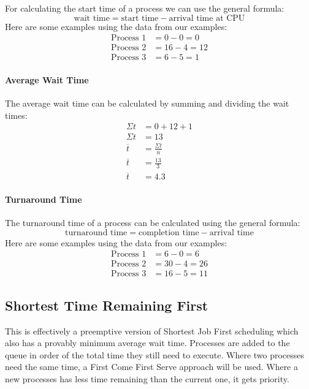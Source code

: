 For calculating the start time of a process we can use the general formula:
\[
	\text{wait time} = \text{start time} - \text{arrival time at CPU}
\]
Here are some examples using the data from our examples:
\begin{align*}
	\text{Process \(1\)} & = 0 - 0 = 0   \\
	\text{Process \(2\)} & = 16 - 4 = 12 \\
	\text{Process \(3\)} & = 6 - 5 = 1
\end{align*}

\paragraph{Average Wait Time}\label{par:average_wait_time_1}

The average wait time can be calculated by summing and dividing the wait times:
\begin{align*}
	\Sigma t     & = 0 + 12 + 1         \\
	\Sigma t     & = 13                 \\
	\overline{t} & = \frac{\Sigma t}{n} \\
	\overline{t} & = \frac{13}{3}       \\
	\overline{t} & = 4.3
\end{align*}

\paragraph{Turnaround Time}\label{par:turnaround_time_1}

The turnaround time of a process can be calculated using the general formula:
\[
	\text{turnaround time} = \text{completion time} - \text{arrival time}
\]
Here are some examples using the data from our examples:
\begin{align*}
	\text{Process \(1\)} & = 6 - 0 = 6   \\
	\text{Process \(2\)} & = 30 - 4 = 26 \\
	\text{Process \(3\)} & = 16 - 5 = 11
\end{align*}

\subsection{Shortest Time Remaining First}\label{sub:shortest_time_remaining_first}

This is effectively a preemptive version of Shortest Job First scheduling which also has a provably minimum average wait time.
Processes are added to the queue in order of the total time they still need to execute.
Where two processes need the same time, a First Come First Serve approach will be used.
Where a new processes has less time remaining than the current one, it gets priority.

